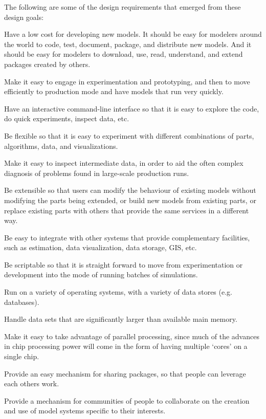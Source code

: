 The following are some of the design requirements that emerged from these design goals:
\squishlist
\item	Have a low cost for developing new models.  It should be easy for modelers around the world to code, test, document, package, and distribute new models.  And it should be easy for modelers to download, use, read, understand, and extend packages created by others.
\item	Make it easy to engage in experimentation and prototyping, and then to move efficiently to production mode and have models that run very quickly.  
\item	Have an interactive command-line interface so that it is easy to explore the code, do quick experiments, inspect data, etc.
\item	Be flexible so that it is easy to experiment with different combinations of parts, algorithms, data, and visualizations.
\item	Make it easy to inspect intermediate data, in order to aid the often complex diagnosis of problems found in large-scale production runs.
\item	Be extensible so that users can modify the behaviour of existing models without modifying the parts being extended, or build new models from existing parts, or replace existing parts with others that provide the same services in a different way.
\item	Be easy to integrate with other systems that provide complementary facilities, such as estimation, data visualization, data storage, GIS, etc.
\item	Be scriptable so that it is straight forward to move from experimentation or development into the mode of running batches of simulations.
\item	Run on a variety of operating systems, with a variety of data stores (e.g. databases).
\item	Handle data sets that are significantly larger than available main memory.
\item	Make it easy to take advantage of parallel processing, since much of the advances in chip processing power will come in the form of having multiple `cores' on a single chip.
\item	Provide an easy mechanism for sharing packages, so that people can leverage each others work.
\item	Provide a mechanism for communities of people to collaborate on the creation and use of model systems specific to their interests.
\squishend

